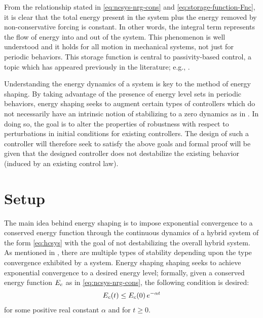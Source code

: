 From the relationship stated in \eqref{eq:ncsys-nrg-cons} and
\eqref{eq:storage-function-Fnc}, it is clear that the total energy present in
the system plus the energy removed by non-conservative forcing is constant.
% 
In other words, the integral term represents the flow of energy into and out of
the system.
% 
This phenomenon is well understood and it holds for all motion in mechanical
systems, not just for periodic behaviors.
% 
This storage function is central to passivity-based control, a topic which
has appeared previously in the literature; e.g., \cite{Spong2007}.

Understanding the energy dynamics of a system is key to the method of energy
shaping.
% 
By taking advantage of the presence of energy level sets in periodic behaviors,
energy shaping seeks to augment certain types of controllers which do not
necessarily have an intrinsic notion of stabilizing to a zero dynamics as in
\cite{Ames2014}.
% 
In doing so, the goal is to alter the properties of robustness with respect to
perturbations in initial conditions for existing controllers.
% 
The design of such a controller will therefore seek to satisfy the above goals
and formal proof will be given that the designed controller does not destabilize
the existing behavior (induced by an existing control law).

\section{Setup}

The main idea behind energy shaping is to impose exponential convergence to a
conserved energy function through the continuous dynamics of a hybrid system of
the form \eqref{eq:hcsys} with the goal of not destabilizing the overall hybrid
system.
% 
As mentioned in , there are multiple types of stability
depending upon the type convergence exhibited by a system.
% 
Energy shaping shaping seeks to achieve exponential convergence to a desired
energy level;
% 
formally, given a conserved energy function $E_{c}$ as in
\eqref{eq:ncsys-nrg-cons}, the following condition is desired:
\begin{align*}
  E_{c}(t) \leq E_{c}(0) \, e^{-\alpha t}
\end{align*}
for some positive real constant $\alpha$ and for $t \geq 0$.

